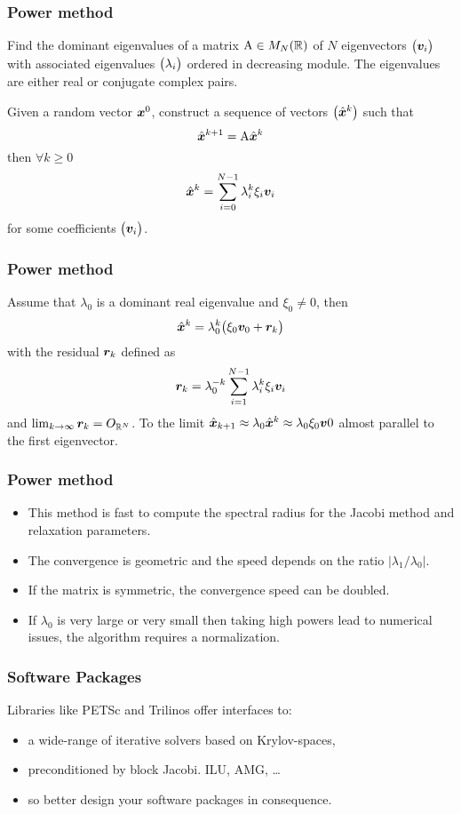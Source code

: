 \begin{frame}
  \frametitle{Power method}

Find the dominant eigenvalues of a matrix ${\mathrm A} \in {M_N(\mathbb{R})}$ of $N$ eigenvectors $\bigl({\boldsymbol v}_i\bigr)$ with associated eigenvalues $\bigl(\lambda_i\bigr)$ ordered in decreasing module.
The eigenvalues are either real or conjugate complex pairs.

\medskip
Given a random vector ${\boldsymbol x}^0$, construct a sequence of vectors $\bigl(\hat{\boldsymbol x}^k\bigr)$ such that
\[
\hat{\boldsymbol x}^{k+1} = {\mathrm A} \hat{\boldsymbol x}^k
\]
then $\forall k \geq 0$
\[
\hat{\boldsymbol x}^k = \sum_{i=0}^{N-1} \lambda_i^k \xi_i {\boldsymbol v}_i
\]
for some coefficients $\bigl({\boldsymbol v}_i\bigr)$.

\end{frame}

\begin{frame}
  \frametitle{Power method}

\medskip
Assume that $\lambda_0$ is a dominant real eigenvalue and $\xi_0 \neq 0$, then
\[
\hat{\boldsymbol x}^k = \lambda_0^k \bigl(\xi_0 {\boldsymbol v}_0 + {\boldsymbol r}_k \bigr)
\]
with the residual ${\boldsymbol r}_k$ defined as
\[
{\boldsymbol r}_k = \lambda_0^{-k} \sum_{i=1}^{N-1} \lambda_i^k \xi_i {\boldsymbol v}_i
\]
and $\lim_{k\rightarrow\infty} {\boldsymbol r}_k = O_{{\mathbb{R}^N}}$.
To the limit $\hat{\boldsymbol x}_{k+1} \approx \lambda_0 \hat{\boldsymbol x}^k \approx \lambda_0\xi_0{\boldsymbol v}0$ almost parallel to the first eigenvector.

\end{frame}

\begin{frame}
  \frametitle{Power method}

\begin{itemize}
\item This method is fast to compute the spectral radius for the Jacobi method and relaxation parameters.
\item The convergence is geometric and the speed depends on the ratio $\lvert \lambda_1 / \lambda_0\rvert$.
\item If the matrix is symmetric, the convergence speed can be doubled.
\item If $\lambda_0$ is very large or very small then taking high powers lead to numerical issues, the algorithm requires a normalization.
\end{itemize}

\end{frame}

\begin{frame}
  \frametitle{Software Packages}

Libraries like PETSc and Trilinos offer interfaces to:
\begin{itemize}
\item a wide-range of iterative solvers based on Krylov-spaces,
\item preconditioned by block Jacobi. ILU, AMG, \dots
\item so better design your software packages in consequence.
\end{itemize}
\end{frame}


